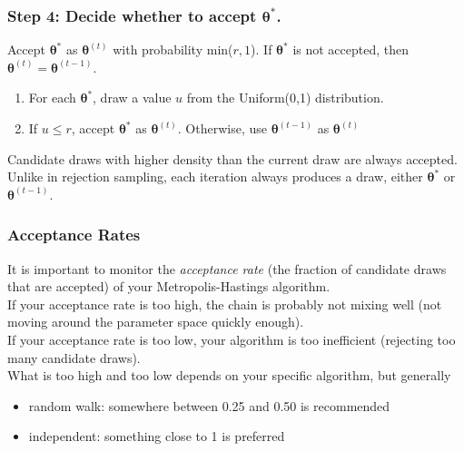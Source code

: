 \documentclass[handout]{beamer}
\begin{document}
\begin{frame}
\frametitle{Step 4: Decide whether to accept $\bm{\theta}^*$.}
\pause
Accept $\bm{\theta}^*$ as $\bm{\theta}^{(t)}$ with probability
min($r,1$).  If $\bm{\theta}^*$ is not accepted, then
$\bm{\theta}^{(t)} = \bm{\theta}^{(t-1)}$. \\
\bigskip
\pause
\begin{enumerate}
\item For each $\bm{\theta}^*$, draw a value $u$ from the Uniform(0,1)
distribution.
\pause
\item If $u \le r$, accept $\bm{\theta}^*$ as $\bm{\theta}^{(t)}$.
Otherwise, use $\bm{\theta}^{(t-1)}$ as $\bm{\theta}^{(t)}$
\end{enumerate}
\pause
\bigskip
Candidate draws with higher density than the current draw are always accepted.\\
\bigskip
\pause
Unlike in rejection sampling, each iteration always produces a draw,
either $\bm{\theta}^*$ or $\bm{\theta}^{(t-1)}$.
\end{frame}

\begin{frame}
\frametitle{Acceptance Rates}
\pause
It is important to monitor the \textit{acceptance rate} (the fraction of
candidate draws that are accepted) of your Metropolis-Hastings algorithm.\\
\pause
\bigskip
If your acceptance rate is too high, the chain is probably not mixing
well (not moving around the parameter space quickly enough).\\
\pause
\bigskip
If your acceptance rate is too low, your algorithm is too inefficient
(rejecting too many candidate draws).\\
\pause
\bigskip
What is too high and too low depends on your specific algorithm, but generally
\pause
\begin{itemize}
\item random walk: somewhere between 0.25 and 0.50 is recommended
\pause
\item independent: something close to 1 is preferred
\end{itemize}
\end{frame}
\end{document}
